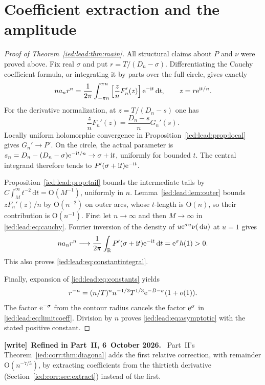 \documentclass[11pt,letterpaper]{article}
\theoremstyle{remark}\newtheorem{remark}[theorem]{Remark}
\newcommand{\ii}{\mathrm i}\newcommand{\dd}{\,\mathrm d}
\newcommand{\Oh}{\mathrm O}\newcommand{\supp}{\operatorname{supp}}
\newenvironment{writenote}[1][]{\par\smallskip\begingroup\small
 \noindent\textbf{[write]}\if\relax\detokenize{#1}\relax\else~\textbf{#1.}\fi\ }%
 {\par\endgroup\smallskip}
\begin{document}
\section{Coefficient extraction and the amplitude}\label{ied:lead:sec:extraction}
\begin{proof}[Proof of Theorem~\ref{ied:lead:thm:main}]
All structural claims about $P$ and $\nu$ were proved above. Fix real $\sigma$ and put $r=T/(D_n-\sigma)$. Differentiating the Cauchy coefficient formula, or integrating it by parts over the full circle, gives exactly
\begin{equation}\label{ied:lead:eq:cauchy}
 n a_n r^n=\frac1{2\pi}\int_{-\pi n}^{\pi n}
 \left[\frac znF_n'(z)\right]\e^{-\ii t}\dd t,
 \qquad z=r\e^{\ii t/n}.
\end{equation}
For the derivative normalization, at $z=T/(D_n-s)$ one has
\[
 \frac znF_n'(z)=\frac{D_n-s}{n}G_n'(s).
\]
Locally uniform holomorphic convergence in Proposition~\ref{ied:lead:prop:local} gives $G_n'\to P'$. On the circle, the actual parameter is
$s_n=D_n-(D_n-\sigma)\e^{-\ii t/n}\to\sigma+\ii t$, uniformly for bounded $t$. The central integrand therefore tends to $P'(\sigma+\ii t)\e^{-\ii t}$.

Proposition~\ref{ied:lead:prop:tail} bounds the intermediate tails by $C\int_M^\infty t^{-2}\dd t=\Oh(M^{-1})$, uniformly in $n$. Lemma~\ref{ied:lead:lem:outer} bounds $zF_n'(z)/n$ by $\Oh(n^{-2})$ on outer arcs, whose $t$-length is $\Oh(n)$, so their contribution is $\Oh(n^{-1})$. First let $n\to\infty$ and then $M\to\infty$ in \eqref{ied:lead:eq:cauchy}. Fourier inversion of the density of $u\e^{\sigma u}\nu(\dd u)$ at $u=1$ gives
\begin{equation}\label{ied:lead:eq:limitcoeff}
 n a_n r^n\longrightarrow
 \frac1{2\pi}\int_\R P'(\sigma+\ii t)\e^{-\ii t}\dd t
 =\e^\sigma h(1)>0.
\end{equation}
This also proves \eqref{ied:lead:eq:constantintegral}.

Finally, expansion of \eqref{ied:lead:eq:constants} yields
\[
 r^{-n}=(n/T)^n n^{-1/3}T^{1/3}\mathrm e^{-B-\sigma}(1+o(1)).
\]
The factor $\mathrm e^{-\sigma}$ from the contour radius cancels the factor $\mathrm e^\sigma$ in \eqref{ied:lead:eq:limitcoeff}. Division by $n$ proves \eqref{ied:lead:eq:asymptotic} with the stated positive constant.
\end{proof}

\begin{writenote}[Refined in Part~II, 6~October 2026]
Part~II's Theorem~\ref{ied:corr:thm:diagonal} adds the first relative correction, with remainder $\Oh(n^{-7/5})$, by extracting coefficients from the thirtieth derivative (Section~\ref{ied:corr:sec:extract}) instead of the first.
\end{writenote}
\end{document}
